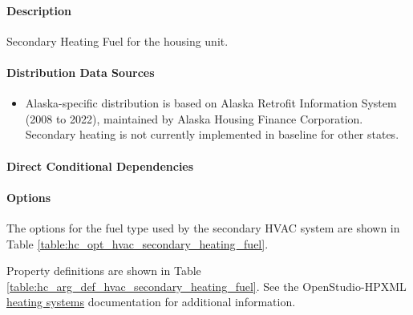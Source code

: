 \paragraph{Description}
% 
Secondary Heating Fuel for the housing unit. 

\paragraph{Distribution Data Sources}
% 
\begin{itemize}
\item Alaska-specific distribution is based on Alaska Retrofit Information System (2008 to 2022), maintained by Alaska Housing Finance Corporation. Secondary heating is not currently implemented in baseline for other states.
\end{itemize}

\paragraph{Direct Conditional Dependencies}


\paragraph{Options}
The options for the fuel type used by the secondary HVAC system are shown in Table \ref{table:hc_opt_hvac_secondary_heating_fuel}.



Property definitions are shown in Table \ref{table:hc_arg_def_hvac_secondary_heating_fuel}. See the OpenStudio-HPXML \href{https://openstudio-hpxml.readthedocs.io/en/v1.10.0/workflow_inputs.html#hpxml-heating-systems}{heating systems} documentation for additional information.



